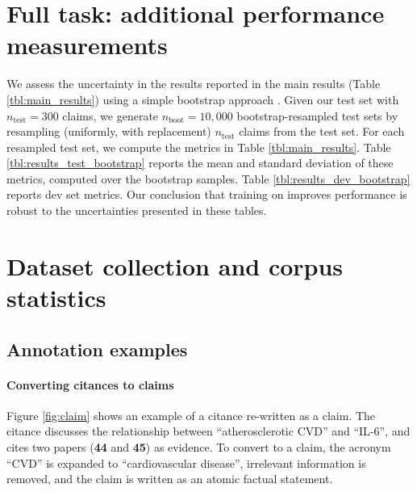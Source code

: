 
\section{Full task: additional performance measurements} \label{sec:uncertainty}

We assess the uncertainty in the results reported in the main results (Table \ref{tbl:main_results}) using a simple bootstrap approach \cite{Dror2018TheHG, BergKirkpatrick2012AnEI, Efron1993AnIT}. Given our test set with $n_{\textrm{test}} = 300$ claims, we generate $n_{\textrm{boot}} = 10,000$ bootstrap-resampled test sets by resampling (uniformly, with replacement) $n_{\textrm{test}}$ claims from the test set. For each resampled test set, we compute the metrics in Table \ref{tbl:main_results}. Table \ref{tbl:results_test_bootstrap} reports the mean and standard deviation of these metrics, computed over the bootstrap samples. Table \ref{tbl:results_dev_bootstrap} reports dev set metrics. Our conclusion that training on \ours improves performance is robust to the uncertainties presented in these tables.

\clearpage




\clearpage



\section{Dataset collection and corpus statistics} \label{sec:data_collection}


\subsection{Annotation examples}

\paragraph{Converting citances to claims} Figure \ref{fig:claim} shows an example of a citance re-written as a claim. The citance discusses the relationship between ``atherosclerotic CVD'' and ``IL-6'', and cites two papers (\textbf{44} and \textbf{45}) as evidence. To convert to a claim, the acronym ``CVD'' is expanded to ``cardiovascular disease'', irrelevant information is removed, and the claim is written as an atomic factual statement.

